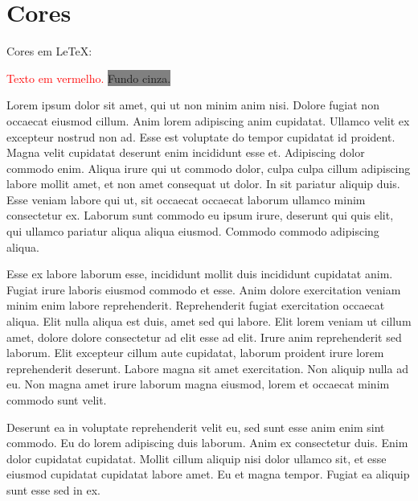 \documentclass{article}
\begin{document}
\section{Cores}

Cores em LeTeX:

\textcolor{red}{Texto em vermelho.} %
\colorbox{gray}{Fundo cinza.} %
\pagecolor{yellow} %

Lorem ipsum dolor sit amet, qui ut non minim anim nisi. Dolore fugiat non occaecat eiusmod cillum.
Anim lorem adipiscing anim cupidatat. Ullamco velit ex excepteur nostrud non ad. Esse est voluptate do tempor cupidatat id proident.
Magna velit cupidatat deserunt enim incididunt esse et. Adipiscing dolor commodo enim.
Aliqua irure qui ut commodo dolor, culpa culpa cillum adipiscing labore mollit amet, et non amet consequat ut dolor.
In sit pariatur aliquip duis. Esse veniam labore qui ut, sit occaecat occaecat laborum ullamco minim consectetur ex.
Laborum sunt commodo eu ipsum irure, deserunt qui quis elit, qui ullamco pariatur aliqua aliqua eiusmod. Commodo commodo adipiscing aliqua.

Esse ex labore laborum esse, incididunt mollit duis incididunt cupidatat anim. Fugiat irure laboris eiusmod commodo et esse. Anim dolore exercitation veniam minim enim labore reprehenderit.
Reprehenderit fugiat exercitation occaecat aliqua. Elit nulla aliqua est duis, amet sed qui labore.
Elit lorem veniam ut cillum amet, dolore dolore consectetur ad elit esse ad elit. Irure anim reprehenderit sed laborum.
Elit excepteur cillum aute cupidatat, laborum proident irure lorem reprehenderit deserunt. Labore magna sit amet exercitation.
Non aliquip nulla ad eu. Non magna amet irure laborum magna eiusmod, lorem et occaecat minim commodo sunt velit.

Deserunt ea in voluptate reprehenderit velit eu, sed sunt esse anim enim sint commodo.
Eu do lorem adipiscing duis laborum. Anim ex consectetur duis. Enim dolor cupidatat cupidatat.
Mollit cillum aliquip nisi dolor ullamco sit, et esse eiusmod cupidatat cupidatat labore amet. Eu et magna tempor.
Fugiat ea aliquip sunt esse sed in ex.
\end{document}
